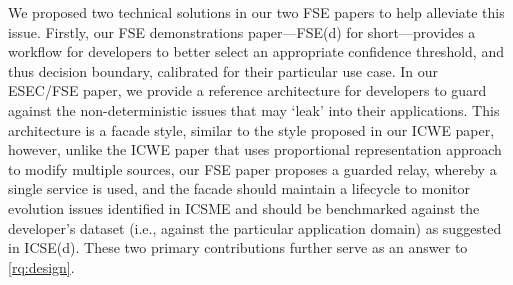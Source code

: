 We proposed two technical solutions in our two FSE papers to help alleviate this issue.  Firstly, our FSE demonstrations paper---FSE(d) for short---provides a workflow for developers to better select an appropriate confidence threshold, and thus decision boundary, calibrated for their particular use case. In our ESEC/FSE paper, we provide a reference architecture for developers to guard against the non-deterministic issues that may `leak' into their applications. This architecture is a facade style, similar to the style proposed in our ICWE paper, however, unlike the ICWE paper that uses proportional representation approach to modify multiple sources, our FSE paper proposes a guarded relay, whereby a single service is used, and the facade should maintain a lifecycle to monitor evolution issues identified in ICSME and should be benchmarked against the developer's dataset (i.e., against the particular application domain) as suggested in ICSE(d). These two primary contributions further serve as an answer to \ref{rq:design}.

